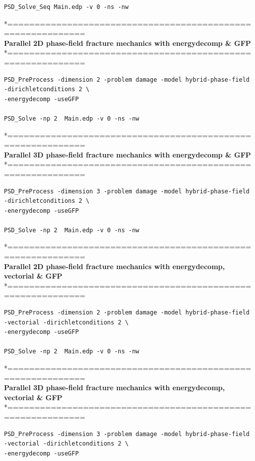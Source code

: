 {{\begin{lstlisting}[style=BashInputStyle]
PSD_Solve_Seq Main.edp -v 0 -ns -nw   
\end{lstlisting}
*============================================================\\
 \textbf{Parallel 2D phase-field fracture mechanics with energydecomp \& GFP} \\
*============================================================\\
\begin{lstlisting}[style=BashInputStyle]
PSD_PreProcess -dimension 2 -problem damage -model hybrid-phase-field -dirichletconditions 2 \
-energydecomp -useGFP  

PSD_Solve -np 2  Main.edp -v 0 -ns -nw   
\end{lstlisting}
*============================================================\\
\textbf{ Parallel 3D phase-field fracture mechanics with energydecomp \& GFP} \\
*============================================================\\
\begin{lstlisting}[style=BashInputStyle]
PSD_PreProcess -dimension 3 -problem damage -model hybrid-phase-field -dirichletconditions 2 \
-energydecomp -useGFP   

PSD_Solve -np 2  Main.edp -v 0 -ns -nw   	
\end{lstlisting}
*============================================================\\
 \textbf{Parallel 2D phase-field fracture mechanics with energydecomp, vectorial \& GFP} \\
*============================================================\\
\begin{lstlisting}[style=BashInputStyle]
PSD_PreProcess -dimension 2 -problem damage -model hybrid-phase-field -vectorial -dirichletconditions 2 \
-energydecomp -useGFP  

PSD_Solve -np 2  Main.edp -v 0 -ns -nw   
\end{lstlisting}
*============================================================\\
\textbf{ Parallel 3D phase-field fracture mechanics with energydecomp, vectorial \& GFP} \\
*============================================================\\
\begin{lstlisting}[style=BashInputStyle]
PSD_PreProcess -dimension 3 -problem damage -model hybrid-phase-field -vectorial -dirichletconditions 2 \
-energydecomp -useGFP   


\end{lstlisting}}}
